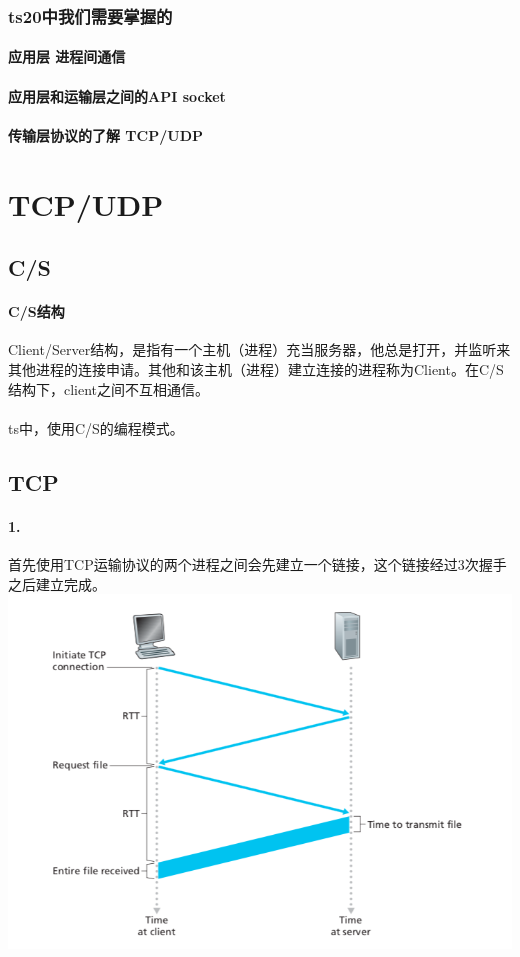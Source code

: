 \documentclass[12pt]{article}
\begin{document}
\begin{CJK}{UTF8}{gbsn}
\subsubsection{ts20中我们需要掌握的}
\paragraph{应用层  进程间通信}
\paragraph{应用层和运输层之间的API  socket}
\paragraph{传输层协议的了解  TCP/UDP}

\section{TCP/UDP}
\subsection{C/S}
\paragraph{C/S结构}Client/Server结构，是指有一个主机（进程）充当服务器，他总是打开，并监听来其他进程的连接申请。其他和该主机（进程）建立连接的进程称为Client。在C/S结构下，client之间不互相通信。
\paragraph{}ts中，使用C/S的编程模式。

\subsection{TCP}
\paragraph{1.}首先使用TCP运输协议的两个进程之间会先建立一个链接，这个链接经过3次握手之后建立完成。\\
\includegraphics[width=6in]{handshake.png}

\end{CJK}
\end{document}
